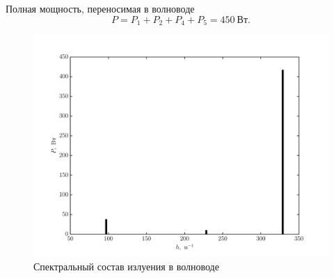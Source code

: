 \documentclass[a4paper,12pt]{extarticle}
\begin{document}
	Полная мощность, переносимая в волноводе
	\[
		P = P_1 + P_2 + P_4 + P_5 = 450~\text{Вт}.
	\]

	\begin{figure}[h]
		\center
		\includegraphics[width=.8\textwidth]{spectrum}
		\caption{Спектральный состав излуения в волноводе}
	\end{figure}
	
\end{document}
